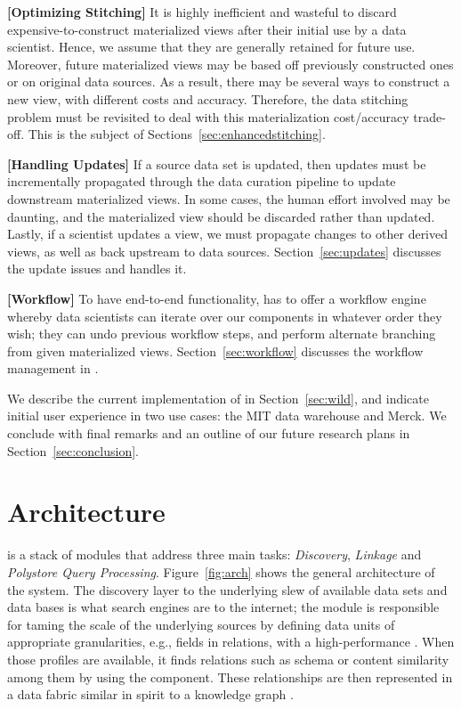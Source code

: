 {\bf [Optimizing Stitching]} It is highly inefficient and wasteful to  discard expensive-to-construct materialized views after their initial use by a data scientist.  Hence, we assume that they are generally retained for future use.  Moreover, future materialized views  may be based off previously constructed ones or on original data sources.  As a result, there may be several ways to construct a new view, with different  costs and accuracy. Therefore, the data stitching problem must be revisited to deal with this materialization cost/accuracy trade-off.  This is the subject of Sections~\ref{sec:enhancedstitching}.

{\bf [Handling Updates]}  If a source data set is updated, then
updates must be incrementally propagated through the data curation pipeline to
update downstream materialized views.  In some cases, the human effort involved may be
daunting, and the materialized view should be discarded rather than updated.  Lastly, if a
scientist updates a view, we must propagate changes to other derived views, as well as back upstream to data sources. Section~\ref{sec:updates} discusses the update issues and \dcv handles it.

{\bf [Workflow]} To have end-to-end functionality, \dcv has to offer a workflow engine whereby data scientists can iterate over our components in whatever order they wish; they can  undo previous workflow steps, and perform alternate branching from given materialized views. Section~\ref{sec:workflow} discusses the  workflow management in \dcv.

We describe the  current implementation of \dcv  in Section~\ref{sec:wild}, and indicate initial user experience in two use cases: the  MIT data warehouse and Merck. We conclude with final remarks and an  outline of  our future research plans in Section~\ref{sec:conclusion}.


\section{Architecture}

\dcv is a stack of modules that address three main tasks: {\em Discovery}, {\em
Linkage} and  {\em Polystore Query Processing}. Figure~\ref{fig:arch} shows the
general architecture of the \dcv system. The discovery layer to the underlying
slew of available data sets and data bases is what search engines are to the
internet; the module is responsible for taming the scale of the underlying
sources by defining data units of appropriate granularities, e.g., fields in
relations, with a high-performance . When those profiles are
available, it finds relations such as schema or content similarity among them by
using the  component. These relationships are then
represented in a data fabric similar in spirit to a knowledge graph
\cite{DBLP:conf/semweb/AuerBKLCI07,DBLP:conf/sigmod/BollackerEPST08,DBLP:conf/www/SuchanekKW07}.

